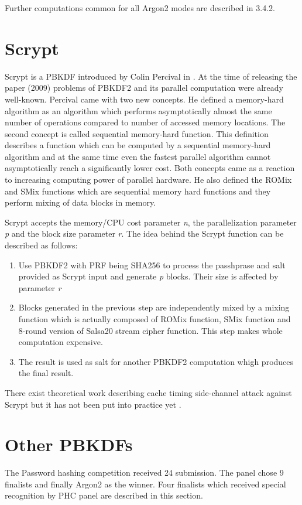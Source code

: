 \documentclass[nolof]{fithesis3}
\begin{document}
Further computations common for all Argon2 modes are described in \parencite{argon2draft}{3.4.2}.

\section{Scrypt}
\label{sec:scrypt}
Scrypt is a PBKDF introduced by Colin Percival in \parencite{memoryhard}. At the time of releasing the paper (2009) problems of PBKDF2 and its parallel computation were already well-known. Percival came with two new concepts. He defined a memory-hard algorithm as an algorithm which performs asymptotically almost the same number of operations compared to number of accessed memory locations. The second concept is called sequential memory-hard function. This definition describes a function which can be computed by a sequential memory-hard algorithm and at the same time even the fastest parallel algorithm cannot asymptotically reach a significantly lower cost. Both concepts came as a reaction to increasing computing power of parallel hardware. He also defined the ROMix and SMix functions which are sequential memory hard functions and they perform mixing of data blocks in memory.

Scrypt accepts the memory/CPU cost parameter \emph{n}, the parallelization parameter \emph{p} and the block size parameter \emph{r}. The idea behind the Scrypt function can be described as follows:

\begin{enumerate}
\item Use PBKDF2 with PRF being SHA256 to process the passhprase and salt provided as Scrypt input and generate \emph{p} blocks. Their size is affected by parameter \emph{r}

\item Blocks generated in the previous step are independently mixed by a mixing function which is actually composed of ROMix function, SMix function and 8-round version of  Salsa20 stream cipher function. This step makes whole computation expensive.

\item The result is used as salt for another PBKDF2 computation whigh produces the final result.
\end{enumerate}

There exist theoretical work describing cache timing side-channel attack against Scrypt but it has not been put into practice yet \parencite{scryptattack}.

\section{Other PBKDFs}
The Password hashing competition received 24 submission. The panel chose 9 finalists and finally Argon2 as the winner. Four finalists which received special recognition by PHC panel are described in this section.
\end{document}
